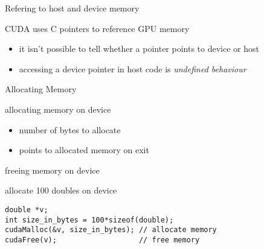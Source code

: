 
\begin{frame}[fragile]{Refering to host and device memory}
    \begin{info}{CUDA uses C pointers to reference GPU memory}
        \begin{itemize}
            \item it isn't possible to tell whether a pointer points to device or host
            \item accessing a device pointer in host code is \emph{undefined behaviour}
        \end{itemize}
    \end{info}

\end{frame}

\begin{frame}[fragile]{Allocating Memory}
    \begin{info}{allocating memory on device}
        \centering {}
    \begin{itemize}
        \item {} number of bytes to allocate
        \item {} points to allocated memory on exit
    \end{itemize}
    \end{info}

    \begin{info}{freeing memory on device}
        \centering {}
    \end{info}

    \begin{code}{allocate 100 doubles on device}
        \begin{lstlisting}[style=boxcuda]
double *v;
int size_in_bytes = 100*sizeof(double);
cudaMalloc(&v, size_in_bytes); // allocate memory
cudaFree(v);                   // free memory
\end{lstlisting}
    \end{code}
\end{frame}

